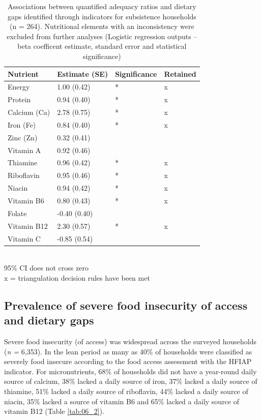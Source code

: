 \begin{table}[H]
  \captionsetup{singlelinecheck = false, justification=justified}
  \caption{
  Associations between quantified adequacy ratios and dietary gaps identified through indicators for subsistence households (n = 264). Nutritional elements with an inconsistency were excluded from further analyses (Logistic regression outputs -- beta coefficent estimate, standard error and statistical significance)
  }
  \label{tab:06_1}
  \small
\begin{tabular}{L{3cm} C{2.5cm} C{2cm} C{2cm}}
\toprule
Nutrient & Estimate (SE) & Significance & Retained \\
\midrule
Energy & 1.00 (0.42) & * & x \\
Protein & 0.94 (0.40) & * & x \\
Calcium (Ca) & 2.78 (0.75) & * & x \\
Iron (Fe) & 0.84 (0.40) & * & x \\
Zinc (Zn) & 0.32 (0.41) & & \\
Vitamin A & 0.92 (0.46) & & \\
Thiamine & 0.96 (0.42) & * & x \\
Riboflavin & 0.95 (0.46) & * & x \\
Niacin & 0.94 (0.42) & * & x \\
Vitamin B6 & 0.80 (0.43) & * & x \\
Folate & -0.40 (0.40) & & \\
Vitamin B12 & 2.30 (0.57) & * & x \\
Vitamin C & -0.85 (0.54) & & \\
\bottomrule
\end{tabular}
\footnotesize
\raggedright
\\
95\% CI does not cross zero\\
x = triangulation decision rules have been met
\end{table}



\subsection{Prevalence of severe food insecurity of access and dietary gaps}

Severe food insecurity (of access) was widespread across the surveyed households (\textit{n =} 6,353). In the lean period as many as 40\% of households were classified as severely food insecure according to the food access assessment with the HFIAP indicator. For micronutrients, 68\% of households did not have a year-round daily source of calcium, 38\% lacked a daily source of iron, 37\% lacked a daily source of thiamine, 51\% lacked a daily source of riboflavin, 44\% lacked a daily source of niacin, 35\% lacked a source of vitamin B6 and 65\% lacked a daily source of vitamin B12 (Table \ref{tab:06_2}).


